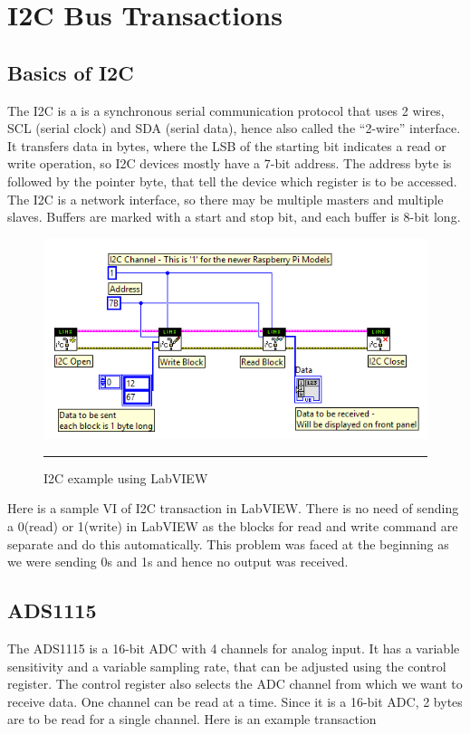 
\chapter{I2C Bus Transactions}
\label{AppendixA}





\section{Basics of I2C}
The I2C is a is a synchronous serial communication protocol that uses 2 wires, SCL (serial clock) and SDA (serial data), hence also called the “2-wire” interface. It transfers data in bytes, where the LSB of the starting bit indicates a read or write operation, so I2C devices mostly have a 7-bit address. The address byte is followed by the pointer byte, that tell the device which register is to be accessed. The I2C is a network interface, so there may be multiple masters and multiple slaves. Buffers are marked with a start and stop bit, and each buffer is 8-bit long.
\begin{figure}[htbp]
	\centering
		\includegraphics[width = 5in]{./Figures/I2Cexample.png}
		\rule{35em}{0.5pt}
	\caption{I2C example using LabVIEW}
	\label{fig:I2C example using LabVIEW}
\end{figure}
Here is a sample VI of I2C transaction in LabVIEW. There is no need of sending a 0(read) or 1(write) in LabVIEW as the blocks for read and write command are separate and do this automatically. This problem was faced at the beginning as we were sending 0s and 1s and hence no output was received.

\section{ADS1115}
The ADS1115 is a 16-bit ADC with 4 channels for analog input. It has a variable sensitivity and a variable sampling rate, that can be adjusted using the control register. The control register also selects the ADC channel from which we want to receive data. One channel can be read at a time. Since it is a 16-bit ADC, 2 bytes are to be read for a single channel. Here is an example transaction

